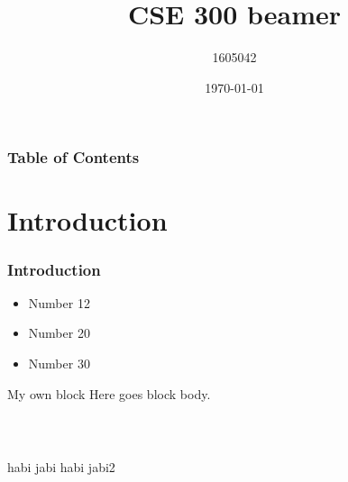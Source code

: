 \documentclass{beamer}
\title[beamer]{CSE 300  beamer}
\author{1605042}
\date{\today}
\begin{document}
\maketitle
\begin{frame}
	\frametitle{Table of Contents}
	\tableofcontents
\end{frame}

\section{Introduction}
\begin{frame}
	\frametitle{Introduction}
	\begin{itemize}
		\item<1-1> Number 12
		\item<2-> Number 20
		\item<3-> Number 30
	\end{itemize}
	\begin{block}{My own block}
		Here goes block body.		
	\end{block}
	\\
	\begin{columns}
		
		habi jabi
		habi jabi2
		
	\end{columns}
\end{frame}
\end{document}
